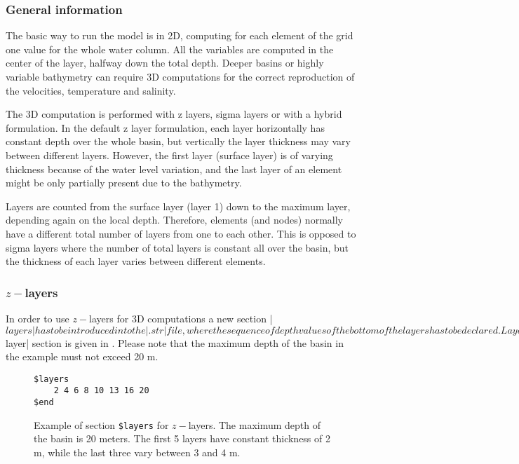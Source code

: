 
\subsubsection{General information}

The basic way to run the model is in 2D, computing for each element of the
grid one value for the whole water column.  All the variables are computed
in the center of the layer, halfway down the total depth.  Deeper basins or highly 
variable bathymetry can require 3D computations for the correct reproduction 
of the velocities, temperature and salinity.

The 3D computation is performed with z layers, sigma layers or with
a hybrid formulation.  In the default z layer formulation, each layer
horizontally has constant depth over the whole basin, but vertically
the layer thickness may vary between different layers. However, the
first layer (surface layer) is of varying thickness because of the water
level variation, and the last layer of an element might be only partially
present due to the bathymetry.

Layers are counted from the surface layer (layer 1) down to the
maximum layer, depending again on the local depth. Therefore, elements
(and nodes) normally have a different total number of layers from one to
each other. This is opposed to sigma layers where the number of total
layers is constant all over the basin, but the thickness of each layer
varies between different elements.

\subsubsection{$z-$layers}

In order to use $z-$layers for 3D computations a new section |$layers|
has to be introduced into the |.str| file, where the sequence of depth
values of the bottom of the layers has to be declared.  Layer
depths must be declared in increasing order. An example of a |$layer|
section is given in \Fig{}. Please note that the maximum
depth of the basin in the example must not exceed 20 m.

\begin{figure}[ht]
\begin{verbatim}
$layers
	2 4 6 8 10 13 16 20
$end
\end{verbatim}
\caption{Example of section {\tt \$layers} for $z-$layers. The maximum depth of 
the basin is 20 meters. The first 5 layers have constant thickness 
of 2 m, while the last three vary between 3 and 4 m.}
\label{fig:zlayers}
\end{figure}

